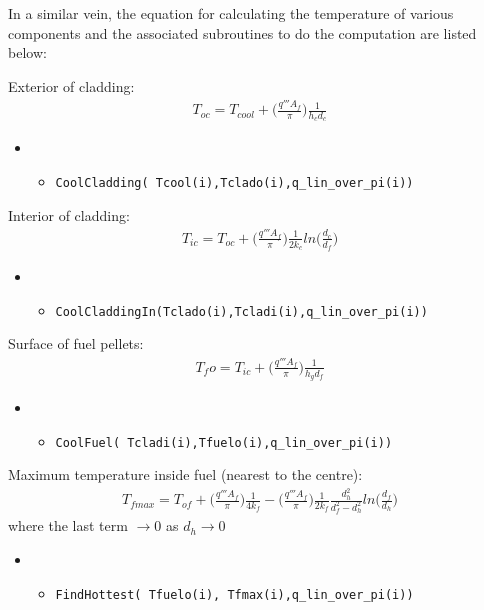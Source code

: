 \documentclass[a4paper, 12pt]{article}
\begin{document}
In a similar vein, the equation for calculating the temperature of various components and the associated subroutines to do the computation are listed below:

Exterior of cladding:
\begin{align}
T_{oc}=T_{cool}+ \bigg(\frac{q''' A_f}{\pi}\bigg) \frac{1}{h_c d_c} \label{Tclado}
\end{align}
\begin{itemize}
	\item[]
	\begin{itemize}
	\item \texttt{\textcolor{subr}{CoolCladding}(   Tcool(i),Tclado(i),q\_lin\_over\_pi(i))}
	\end  {itemize}
\end  {itemize}

Interior of cladding:
\begin{align}
T_{ic} = T_{oc} + \bigg(\frac{q''' A_f}{\pi}\bigg) \frac{1}{2 k_c} ln\bigg(\frac{d_c}{d_f}\bigg) \label{Tcladi}
\end{align}
\begin{itemize}
	\item[]
	\begin{itemize}
	\item \texttt{\textcolor{subr}{CoolCladdingIn}(Tclado(i),Tcladi(i),q\_lin\_over\_pi(i))}
	\end  {itemize}
\end  {itemize}

Surface of fuel pellets:
\begin{align}
T_fo = T_{ic} + \bigg(\frac{q''' A_f}{\pi}\bigg) \frac{1}{h_g d_f} \label{Tfuelo}
\end{align}
\begin{itemize}
	\item[]
	\begin{itemize}
	\item \texttt{\textcolor{subr}{CoolFuel}(      Tcladi(i),Tfuelo(i),q\_lin\_over\_pi(i))}
	\end  {itemize}
\end  {itemize}

Maximum temperature inside fuel (nearest to the centre):
\begin{align}
T_{fmax} = T_{of}+ \bigg(\frac{q''' A_f}{\pi}\bigg) \frac{1}{4 k_f}  
- \bigg(\frac{q''' A_f}{\pi}\bigg) \frac{1}{2 k_f} \frac{d_h^2}{d_f^2-d_h^2} ln\bigg(\frac{d_f}{d_h}\bigg)\label{Tfmax}
\end{align}
where the last term $\rightarrow 0$  as $d_h\rightarrow 0$
\begin{itemize}
	\item[]
	\begin{itemize}
	\item \texttt{\textcolor{subr}{FindHottest}(   Tfuelo(i), Tfmax(i),q\_lin\_over\_pi(i))}
	\end  {itemize}
\end  {itemize}
\end{document}
